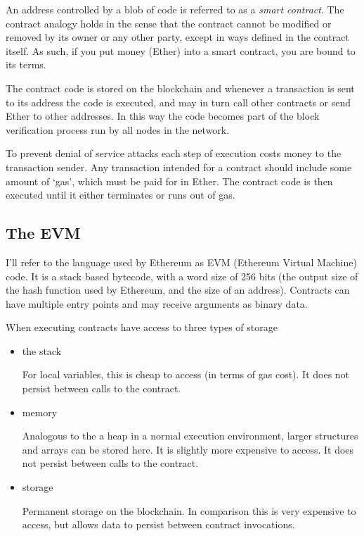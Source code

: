 \documentclass[12pt,a4paper,twoside,openright]{report}
\begin{document}
An address controlled by a blob of code is referred to as a \textit{smart contract}.
The contract analogy holds in the sense that the contract cannot be modified or removed by
its owner or any other party, except in ways defined in the contract itself.
As such, if you put money (Ether) into a smart contract, you are bound to its terms.

The contract code is stored on the blockchain and whenever a transaction is sent to its address the code is executed,
and may in turn call other contracts or send Ether to other addresses.
In this way the code becomes part of the block verification process run by all nodes in the network.

To prevent denial of service attacks each step of execution costs money to the transaction sender.
Any transaction intended for a contract should include some amount of `gas', which must be paid for in Ether.
The contract code is then executed until it either terminates or runs out of gas.

\subsection{The EVM}


I'll refer to the language used by Ethereum as EVM (Ethereum Virtual Machine) code.
It is a stack based bytecode, with a word size of 256 bits (the output size of the hash function used by Ethereum, and the size of an address).
Contracts can have multiple entry points and may receive arguments as binary data.

When executing contracts have access to three types of storage

\begin{itemize}
\item the stack

For local variables, this is cheap to access (in terms of gas cost).
It does not persist between calls to the contract.

\item memory

Analogous to the a heap in a normal execution environment, larger structures and arrays can be stored here.
It is slightly more expensive to access.
It does not persist between calls to the contract.

\item storage

Permanent storage on the blockchain.
In comparison this is very expensive to access, but allows data to persist between contract invocations.
\end{itemize}
\end{document}
